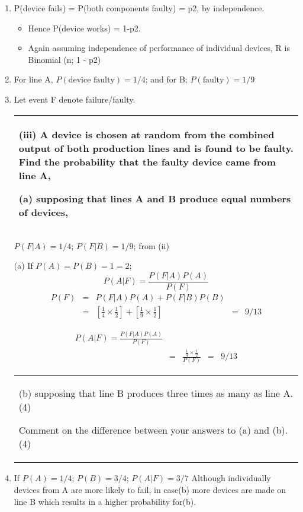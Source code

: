 \documentclass[a4paper,12pt]{article}
\begin{document}
\begin{enumerate}
    \item P(device fails) = P(both components faulty) = p2, by independence.
    
\begin{itemize}
    \item Hence P(device works) =
1-p2. 
\item Again assuming independence of performance of individual devices, R is Binomial
(n; 1 - p2)
\end{itemize}
\item For line A, $P(\mbox{device faulty}) = 1/4$; and for B; $P(\mbox{faulty}) = 1/9$
\item  Let event F denote failure/faulty.
  \begin{table}[ht!]
     \centering
     \begin{tabular}{|p{15cm}|}
     \hline
(iii) A device is chosen at random from the combined output of both production lines and is found to be faulty.  Find the probability that the faulty device came from line A, 
 
(a) supposing that lines A and B produce equal numbers of devices, 
\\ \hline 
      \end{tabular}
    \end{table} 
$P(F|A) = 1/4$; $P(F|B) = 1/9$; from (ii)

(a) If $P(A) = P(B) = 1=2$; 
\[P(A|F) = \frac{P(F|A)P(A)}{P(F)}\] 
\begin{eqnarray*}
P(F) &=&  P(F|A)P(A)+P(F|B)P(B) \\ 
&=& \left[\frac{1}{4} \times \frac{1}{2} \right] + \left[\frac{1}{9} \times \frac{1}{2} \right] 
&=& 9/13
\end{eqnarray*}

\begin{eqnarray*}
P(A|F) = \frac{P(F|A)P(A)}{P(F)} \\ 
&=& \frac{\frac{1}{4} \times \frac{1}{2}}{P(F)}
&=& 9/13
\end{eqnarray*}
 \begin{table}[ht!]
     \centering
     \begin{tabular}{|p{15cm}|}
     \hline
  (b) supposing that line B produces three times as many as line A. 
(4) 
 
  Comment on the difference between your answers to (a) and (b). 
(4) 
      \end{tabular}
    \end{table}
\item  If $P(A) = 1/4$; $P(B) = 3/4$; $P(A|F) = 3/7$
Although individually devices from A are more likely to fail, in case(b) more devices
are made on line B which results in a higher probability for(b).
\end{enumerate}
\end{document}
